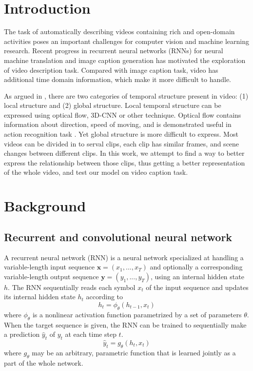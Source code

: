



\tableofcontents
\clearpage


\section{Introduction}
The task of automatically describing videos containing rich and open-domain activities poses an important challenges for computer vision and machine learning research. Recent progress in recurrent neural networks (RNNs) for neural machine translation and image caption generation has motivated the exploration of video description task. Compared with image caption task, video has additional time domain information, which make it more difficult to handle.

As argued in \cite{yao2015describing}, there are two categories of temporal structure present in video: (1) local structure and (2) global structure. Local temporal structure can be expressed using optical flow, 3D-CNN \cite{tran2014c3d} or other technique. Optical flow contains information about direction, speed of moving, and is demonstrated useful in action recognition task \cite{simonyan2014two}. Yet global structure is more difficult to express. Most videos can be divided in to serval clips, each clip has similar frames, and scene changes between different clips. In this work, we attempt to find a way to better express the relationship between those clips, thus getting a better representation of the whole video, and test our model on video caption task.

\section{Background}
\subsection{Recurrent and convolutional neural network}
A recurrent neural network (RNN) is a neural network specialized at handling a variable-length input sequence $\mathbf{x}=(x_1,...,x_T)$ and optionally a corresponding variable-length output sequence $\mathbf{y}=(y_1,...,y_T)$, using an internal hidden state $h$. The RNN sequentially reads each symbol $x_t$ of the input sequence and updates its internal hidden state $h_t$ according to
\begin{equation}
h_t=\phi_\theta(h_{t-1},x_t)
\end{equation}
where $\phi_\theta$ is a nonlinear activation function parametrized by a set of parameters $\theta$. When the target sequence is given, the RNN can be trained to sequentially make a prediction $\hat{y}_t$ of $y_t$ at each time step $t$.
\begin{equation}
\hat{y}_t=g_\theta(h_{t},x_t)
\end{equation}
where $g_\theta$ may be an arbitrary, parametric function that is learned jointly as a part of the whole network.

